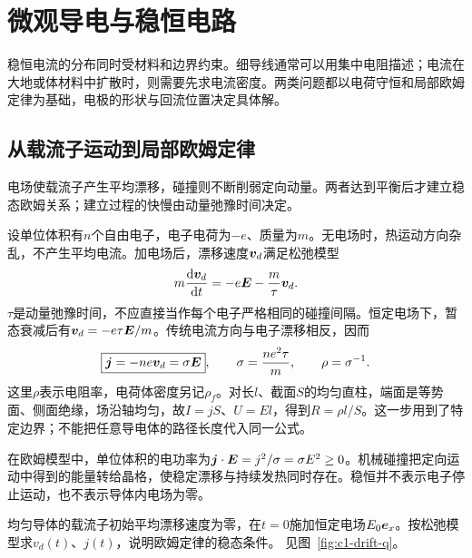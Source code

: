 \chapter{微观导电与稳恒电路}
稳恒电流的分布同时受材料和边界约束。细导线通常可以用集中电阻描述；电流在大地或体材料中扩散时，则需要先求电流密度。两类问题都以电荷守恒和局部欧姆定律为基础，电极的形状与回流位置决定具体解。



\section{从载流子运动到局部欧姆定律}\label{sec:c1-local}
电场使载流子产生平均漂移，碰撞则不断削弱定向动量。两者达到平衡后才建立稳态欧姆关系；建立过程的快慢由动量弛豫时间决定。

设单位体积有$n$个自由电子，电子电荷为$-e$、质量为$m$。无电场时，热运动方向杂乱，不产生平均电流。加电场后，漂移速度$\bm{v}_d$满足松弛模型
\[
 m\frac{\mathop{}\!\mathrm d\bm{v}_d}{\mathop{}\!\mathrm d t}=-e\bm{E}-\frac m\tau\bm{v}_d.
\]
$\tau$是动量弛豫时间，不应直接当作每个电子严格相同的碰撞间隔。恒定电场下，暂态衰减后有$\bm{v}_d=-e\tau\bm{E}/m$。传统电流方向与电子漂移相反，因而
\[
 \boxed{\bm{j}=-ne\bm{v}_d=\sigma\bm{E}},\qquad
 \sigma=\frac{ne^2\tau}{m},\qquad \rho=\sigma^{-1}.
\]
这里$\rho$表示电阻率，电荷体密度另记$\rho_f$。对长$l$、截面$S$的均匀直柱，端面是等势面、侧面绝缘，场沿轴均匀，故$I=jS$、$U=El$，得到$R=\rho l/S$。这一步用到了特定边界；不能把任意导电体的路径长度代入同一公式。

在欧姆模型中，单位体积的电功率为$\bm{j}\cdot\bm{E}=j^2/\sigma=\sigma E^2\ge0$。机械碰撞把定向运动中得到的能量转给晶格，使稳定漂移与持续发热同时存在。稳恒并不表示电子停止运动，也不表示导体内电场为零。

\begin{example}[电场开启后的漂移与电流建立]\label{ex:c1-drift}
均匀导体的载流子初始平均漂移速度为零，在$t=0$施加恒定电场$E_0\bm{e}_x$。按松弛模型求$v_d(t)$、$j(t)$，说明欧姆定律的稳态条件。 见图~\ref{fig:c1-drift-q}。
\end{example}

